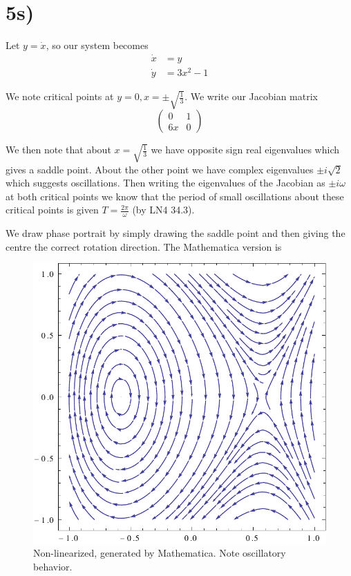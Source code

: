 \documentclass[10pt,twocolumn]{article}
\begin{document}
\section*{5s)}

Let $y = \dot{x}$, so our system becomes
\begin{align*}
    \dot{x} &= y\\
    \dot{y} &= 3x^2 - 1
\end{align*}

We note critical points at $y=0, x = \pm \sqrt{\frac{1}{3}}$. We write our Jacobian matrix
$$\begin{pmatrix} 0&1\\6x & 0 \end{pmatrix} $$

We then note that about $x = \sqrt{\frac{1}{3}}$ we have opposite sign real eigenvalues which gives a saddle point. About the other point we have complex eigenvalues $\pm i \sqrt{2}$ which suggests oscillations. Then writing the eigenvalues of the Jacobian as $\pm i\omega$ at both critical points we know that the period of small oscillations about these critical points is given $T = \frac{2\pi}{\omega}$ (by LN4 34.3). 

We draw phase portrait by simply drawing the saddle point and then giving the centre the correct rotation direction. The Mathematica version is 
\begin{figure}[!h]
    \centering
    \includegraphics[scale=0.3]{Ma2aFinal5Phase.pdf}
    \caption{Non-linearized, generated by Mathematica. Note oscillatory behavior.}
\end{figure}
\end{document}
